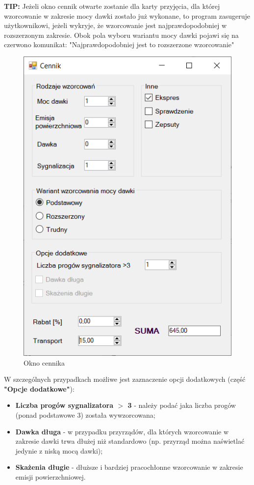 \textbf{TIP:} Jeżeli okno cennik otwarte zostanie dla karty przyjęcia, dla której wzorcowanie w zakresie mocy dawki zostało już wykonane, to program zasugeruje użytkownikowi, jeżeli wykryje, że wzorcowanie jest najprawdopodobniej w rozszerzonym zakresie. Obok pola wyboru wariantu mocy dawki pojawi się na czerwono komunikat: "Najprawdopodobniej jest to rozszerzone wzorcowanie"

\begin{figure}[htb]
	\centering
	\includegraphics{obrazki/Biuro/cennik.png}
	\caption{Okno cennika}
	\label{cennikRys}
\end{figure}

W szczególnych przypadkach możliwe jest zaznaczenie opcji dodatkowych (część \textbf{"Opcje dodatkowe"}):
\begin{itemize}
	\item \textbf{Liczba progów sygnalizatora $>$ 3} - należy podać jaka liczba progów (ponad podstawowe 3) została wywzorcowana;
	\item \textbf{Dawka długa} - w przypadku przyrządów, dla których wzorcowanie w zakresie dawki trwa dłużej niż standardowo (np. przyrząd można naświetlać jedynie z niską mocą dawki);
	\item \textbf{Skażenia długie} - dłuższe i bardziej pracochłonne wzorcowanie w zakresie emisji powierzchniowej.
\end{itemize}

